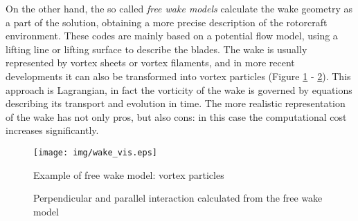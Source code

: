 On the other hand, the so called \textit{free wake models} calculate the wake geometry as a part of the solution, obtaining a more precise description of the rotorcraft environment. These codes are mainly based on a potential flow model, using a lifting line or lifting surface to describe the blades. The wake is usually represented by vortex sheets or vortex filaments, and in more recent developments it can also be transformed into vortex particles (Figure \ref{wake_vis} - \ref{free_wake_interactions}). This approach is Lagrangian, in fact the vorticity of the wake is governed by equations describing its transport and evolution in time. The more realistic representation of the wake has not only pros, but also cons: in this case the computational cost increases significantly.


\begin{figure}
	\centering
	\texttt{[image: img/wake\_vis.eps]}
	\caption{Example of free wake model: vortex particles}
	\label{wake_vis}
\end{figure}

\begin{figure}
	\centering
	\caption{Perpendicular and parallel interaction calculated from the free wake model}
	\label{free_wake_interactions}
\end{figure}